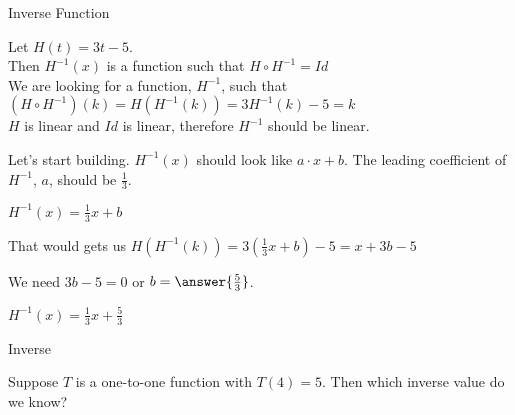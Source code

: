 \documentclass{ximera}
\begin{document}
\begin{example} Inverse Function


Let $H(t) = 3t - 5$. \\

Then $H^{-1}(x)$ is a function such that $H \circ H^{-1} = Id$ \\


We are looking for a function, $H^{-1}$, such that $(H \circ H^{-1})(k) = H(H^{-1}(k)) = 3 H^{-1}(k) - 5 = k$ \\



$H$ is linear and $Id$ is linear, therefore $H^{-1}$ should be linear.

Let's start building.  $H^{-1}(x)$ should look like $a \cdot x + b$.  The leading coefficient of $H^{-1}$, $a$, should be $\frac{1}{3}$.


$H^{-1}(x) =\frac{1}{3} x + b$


That would gets us $H(H^{-1}(k)) = 3 (\frac{1}{3}x + b) - 5 = x + 3b - 5 $


We need $3b - 5 = 0$ or $b = \answer{\frac{5}{3}}$.


$H^{-1}(x) =\frac{1}{3} x + \frac{5}{3}$



\end{example}




\begin{question} Inverse


Suppose $T$ is a one-to-one function with $T(4) = 5$. Then which inverse value do we know?


\begin{multipleChoice}
\end{multipleChoice}

\end{question}
\end{document}

